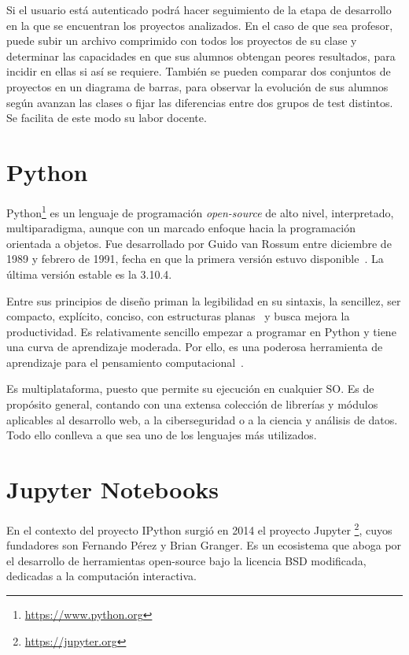 \documentclass[a4paper, 12pt]{book}
\begin{document}
Si el usuario está autenticado podrá hacer seguimiento de la etapa de desarrollo en la que se encuentran los proyectos analizados. En el caso de que sea profesor, puede subir un archivo comprimido con todos los proyectos de su clase y determinar las capacidades en que sus alumnos obtengan peores resultados, para incidir en ellas si así se requiere. También se pueden comparar dos conjuntos de proyectos en un diagrama de barras, para observar la evolución de sus alumnos según avanzan las clases o fijar las diferencias entre dos grupos de test distintos. Se facilita de este modo su labor docente.

\section{Python}
\label{sec:python}
Python\footnote{\url{https://www.python.org}} es un lenguaje de programación \emph{open-source} de alto nivel, interpretado, multiparadigma, aunque con un marcado enfoque hacia la programación orientada a objetos. Fue desarrollado por Guido van Rossum entre diciembre de 1989 y febrero de 1991, fecha en que la primera versión estuvo disponible~\cite{van2007python}. La última versión estable es la 3.10.4.

Entre sus principios de diseño priman la legibilidad en su sintaxis, la sencillez, ser compacto, explícito, conciso, con estructuras planas~\cite{peters2010zen} y busca mejora la productividad. Es relativamente sencillo empezar a programar en Python y tiene una curva de aprendizaje moderada. Por ello, es una poderosa herramienta de aprendizaje para el pensamiento computacional~\cite{wang2021research}.

Es multiplataforma, puesto que permite su ejecución en cualquier SO. Es de propósito general, contando con una extensa colección de librerías y módulos aplicables al desarrollo web, a la ciberseguridad o a la ciencia y análisis de datos. Todo ello conlleva a que sea uno de los lenguajes más utilizados. 

\section{Jupyter Notebooks}
\label{sec:jupyter}

En el contexto del proyecto IPython surgió en 2014 el proyecto Jupyter \footnote{\url{https://jupyter.org}}, cuyos fundadores son Fernando Pérez y Brian Granger. Es un ecosistema que aboga por el desarrollo de herramientas open-source bajo la licencia BSD modificada, dedicadas a la computación interactiva. 
\end{document}
